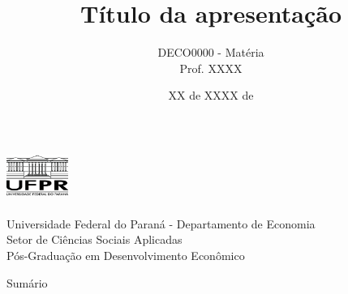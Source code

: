 \documentclass[aspectratio=169, 9pt]{beamer}
\title[short-title]{Título da apresentação}
\author[Felipe Duplat Luz]{DECO0000 - Matéria \\ Prof. XXXX}
\institute[UFPR] %
{
    \vspace{0.5mm} {\normalsize Felipe Duplat Luz} \vspace{5mm}
}
\date{XX de XXXX de \the\year{}}
\begin{document}
\begin{frame}[plain]
    \begin{center}
            \begin{minipage}[c]{0.2\linewidth}
                    \begin{center}
                    \includegraphics[width=2cm, height=1.7cm]{./Imagens/logo_UFPR.png} 
                    \end{center}
            \end{minipage}
            \begin{minipage}[c]{0.7\linewidth}
                    \begin{flushleft}
                    \begin{large}
                    Universidade Federal do Paraná - Departamento de Economia \\ \vspace{1mm} Setor de Ciências Sociais Aplicadas \\
                    \vspace{1mm} Pós-Graduação em Desenvolvimento Econômico
                    \end{large} 
                    \end{flushleft}
            \end{minipage}
    \end{center}
\titlepage 
\end{frame}


\begingroup
{}
\begin{frame}{Sumário}
	\tableofcontents[hideallsubsections]
\end{frame}
\endgroup




\nocite{*}



\end{document}
